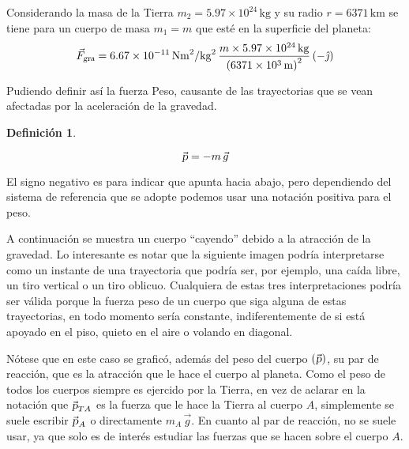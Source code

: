 \documentclass[a5paper,12pt,twoside]{book}
\newtheorem{defn}{{Definición}}[chapter]
\begin{document}
Considerando la masa de la Tierra $m_2=5.97 \times 10^{24} \, \si{\kilo\gram}$ y su radio $r=6371 \, \si{\kilo\metre}$ se tiene para un cuerpo de masa $m_1=m$ que esté en la superficie del planeta:
\begin{equation*}
    {{\vec{F}}_\textsl{{gra}}} = 6.67 \times 10^{-11} \, \si{\newton\metre^2\per\kilo\gram^2} \, \frac{m \times 5.97 \times 10^{24} \, \si{\kilo\gram}}{\left(6371 \times 10^{3} \, \si{\metre}\right)^2} \left(-\hat{\jmath}\right)
\end{equation*}

Pudiendo definir así la fuerza Peso, causante de las trayectorias que se vean afectadas por la aceleración de la gravedad.

\begin{mdframed}[style=MyFrame1]
    \begin{defn}
        \label{defn:weightForce}
    \end{defn}
    \begin{equation*}
        \Vec{\textsl{p}} = -m \, \Vec{g}
    \end{equation*}
\end{mdframed}

El signo negativo es para indicar que apunta hacia abajo, pero dependiendo del sistema de referencia que se adopte podemos usar una notación positiva para el peso.

A continuación se muestra un cuerpo ``cayendo'' debido a la atracción de la gravedad.
Lo interesante es notar que la siguiente imagen podría interpretarse como un instante de una trayectoria que podría ser, por ejemplo, una caída libre, un tiro vertical o un tiro oblicuo.
Cualquiera de estas tres interpretaciones podría ser válida porque la fuerza peso de un cuerpo que siga alguna de estas trayectorias, en todo momento sería constante, indiferentemente de si está apoyado en el piso, quieto en el aire o volando en diagonal.

\begin{center}
    \def\svgwidth{0.85\linewidth}
    
\end{center}

Nótese que en este caso se graficó, además del peso del cuerpo $(\Vec{\textsl{p}})$, su par de reacción, que es la atracción que le hace el cuerpo al planeta.
Como el peso de todos los cuerpos siempre es ejercido por la Tierra, en vez de aclarar en la notación que $\Vec{\textsl{p}}_{TA}$ es la fuerza que le hace la Tierra al cuerpo $A$, simplemente se suele escribir $\Vec{\textsl{p}}_A$ o directamente $m_A \, \Vec{g}$.
En cuanto al par de reacción, no se suele usar, ya que solo es de interés estudiar las fuerzas que se hacen sobre el cuerpo $A$.
\end{document}
